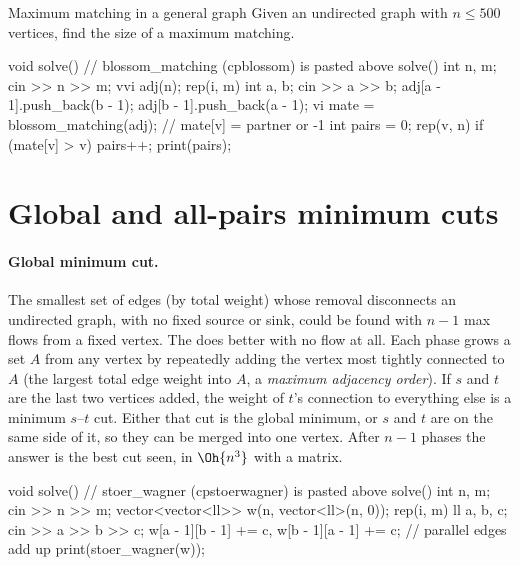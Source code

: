 \begin{problem}{Maximum matching in a general graph}
Given an undirected graph with $n \le 500$ vertices, find the size of a maximum matching.
\end{problem}

\begin{code}
void solve() {  // blossom_matching (cpblossom) is pasted above solve()
    int n, m;
    cin >> n >> m;
    vvi adj(n);
    rep(i, m) {
        int a, b;
        cin >> a >> b;
        adj[a - 1].push_back(b - 1);
        adj[b - 1].push_back(a - 1);
    }
    vi mate = blossom_matching(adj);  // mate[v] = partner or -1
    int pairs = 0;
    rep(v, n) if (mate[v] > v) pairs++;
    print(pairs);
}
\end{code}


\section[Global and all-pairs minimum cuts]{Global and all-pairs minimum cuts \hfill \ioi}\label{sec:globalcut}

\paragraph{Global minimum cut.} The smallest set of edges (by total weight) whose removal disconnects an undirected graph, with no
fixed source or sink, could be found with $n - 1$ max flows from a fixed vertex. The  does better
with no flow at all. Each phase grows a set $A$ from any vertex by repeatedly adding the vertex most tightly connected to $A$ (the
largest total edge weight into $A$, a \emph{maximum adjacency order}). If $s$ and $t$ are the last two vertices added, the weight of
$t$'s connection to everything else is a minimum $s$--$t$ cut. Either that cut is the global minimum, or $s$ and $t$ are on the same
side of it, so they can be merged into one vertex. After $n - 1$ phases the answer is the best cut seen, in $\Oh{n^3}$ with a
matrix.

\begin{code}
void solve() {  // stoer_wagner (cpstoerwagner) is pasted above solve()
    int n, m;
    cin >> n >> m;
    vector<vector<ll>> w(n, vector<ll>(n, 0));
    rep(i, m) {
        ll a, b, c;
        cin >> a >> b >> c;
        w[a - 1][b - 1] += c, w[b - 1][a - 1] += c;  // parallel edges add up
    }
    print(stoer_wagner(w));
}
\end{code}

